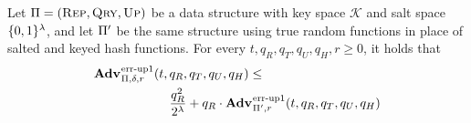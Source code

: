 \begin{lemma}\label{lemma:keytorand}
  Let $\mathrm{\Pi} = (\textnormal{\textsc{Rep}}, \textnormal{\textsc{Qry}}, \textnormal{\textsc{Up}})$ be a data structure with key space
  $\mathcal{K}$ and salt space $\{0,1\}^\lambda$, and let $\mathrm{\Pi}'$ be the same
  structure using true random functions in place of salted and keyed hash
  functions. For every $t, q_R, q_T, q_U, q_H, r \geq 0$, it holds that
  \begin{equation*}
    \begin{aligned}
      \Adv{\errep1}_{\struct,\delta,r}(t,\,&q_R, q_T, q_U, q_H) \leq \\
        &\frac{q_R^2}{2^\lambda} + q_R \cdot \Adv{\errep1}_{\struct',r}(t, q_R, q_T, q_U, q_H)
     \end{aligned}
  \end{equation*}
\end{lemma}

